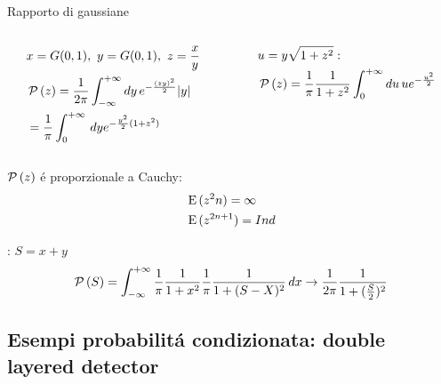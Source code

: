 \documentclass[asd-beamer.tex]{subfiles}%
\begin{document}
\begin{wordonframe}{Rapporto di gaussiane}
	\begin{columns}[T]
		\begin{column}{0.5\textwidth}
			\begin{align*}
			&x=G{(0,1)},\ y=G{(0,1)},\ z=\frac{x}{y}\\
			&\operatorname{\mathcal{P}}{(z)}=\frac{1}{2\pi}\int_{-\infty}^{+\infty}{}dy\,e^{-\frac{(zy)^2}{2}}|y|\\
			&=\frac{1}{\pi}\int_{0}^{+\infty}{}\,dye^{-\frac{y^2}{2}(1+z^2)}
			\end{align*}
		\end{column}
		\begin{column}{0.5\textwidth}
			\begin{align*}
			&u=y\sqrt{1+z^2}:\\
			&\operatorname{\mathcal{P}}{(z)}=\frac{1}{\pi}\frac{1}{1+z^2}\int_{0}^{+\infty}{}du\,ue^{-\frac{u^2}{2}}
			\end{align*}
		\end{column}
	\end{columns}
	$\operatorname{\mathcal{P}}{(z)}$ \'e proporzionale a Cauchy:
	\begin{align*}
	&\operatorname{E}{(z^2n)}=\infty\\
	&\operatorname{E}{(z^{2n+1})}=Ind
	\end{align*}
	\begin{block}{: $S=x+y$}
		\[\operatorname{\mathcal{P}}{(S)}=\int_{-\infty}^{+\infty}\frac{1}{\pi}\frac{1}{1+x^2}\frac{1}{\pi}\frac{1}{1+(S-X)^2}\,dx\to\frac{1}{2\pi}\frac{1}{1+(\frac{S}{2})^2}\]
	\end{block}
\end{wordonframe}

\subsection{Esempi probabilit\'a condizionata: double layered detector}
	
\end{document}
